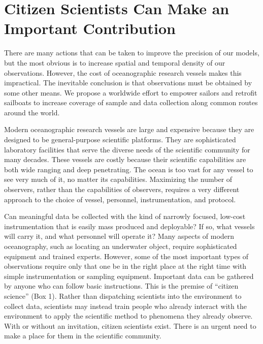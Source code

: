 \section{Citizen Scientists Can Make an Important Contribution}

There are many actions that can be taken to improve the precision of our models, but the most obvious is to increase spatial and temporal density of our observations. However, the cost of oceanographic research vessels makes this impractical. The inevitable conclusion is that observations must be obtained by some other means. We propose a worldwide effort to empower sailors and retrofit sailboats to increase coverage of sample and data collection along common routes around the world.

Modern oceanographic research vessels are large and expensive because they are designed to be general-purpose scientific platforms. They are sophisticated laboratory facilities that serve the diverse needs of the scientific community for many decades. These vessels are costly because their scientific capabilities are both wide ranging and deep penetrating. The ocean is too vast for any vessel to see very much of it, no matter its capabilities. Maximizing the number of observers, rather than the capabilities of observers, requires a very different approach to the choice of vessel, personnel, instrumentation, and protocol.

Can meaningful data be collected with the kind of narrowly focused, low-cost instrumentation that is easily mass produced and deployable? If so, what vessels will carry it, and what personnel will operate it? Many aspects of modern oceanography, such as locating an underwater object, require sophisticated equipment and trained experts. However, some of the most important types of observations require only that one be in the right place at the right time with simple instrumentation or sampling equipment. Important data can be gathered by anyone who can follow basic instructions. This is the premise of ``citizen science'' (Box 1). Rather than dispatching scientists into the environment to collect data, scientists may instead train people who already interact with the environment to apply the scientific method to phenomena they already observe. With or without an invitation, citizen scientists exist. There is an urgent need to make a place for them in the scientific community.
